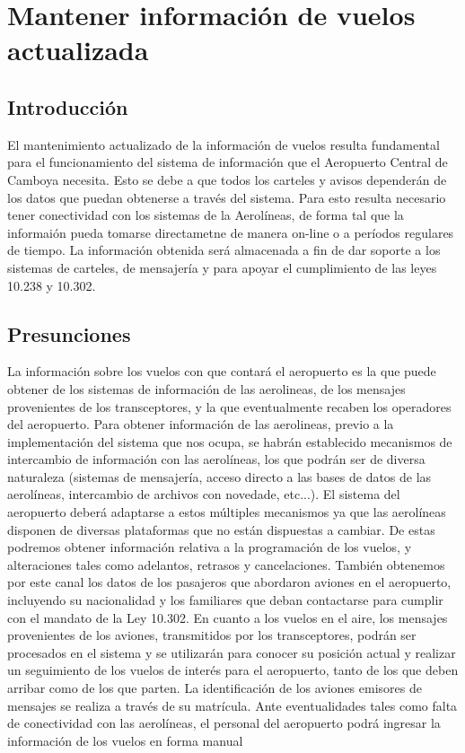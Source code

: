 \section{Mantener información de vuelos actualizada}

\subsection{Introducción}

El mantenimiento actualizado de la información de vuelos resulta fundamental para el funcionamiento del sistema de información que el Aeropuerto Central de Camboya necesita. Esto se debe a que todos los carteles y avisos dependerán de los datos que puedan obtenerse a través del sistema. Para esto resulta necesario tener conectividad con los sistemas de la Aerolíneas, de forma tal que la informaión pueda tomarse directametne de manera on-line o a períodos regulares de tiempo. La información obtenida será almacenada a fin de dar soporte a los sistemas de carteles, de mensajería y para apoyar el cumplimiento de las leyes 10.238 y 10.302.

\subsection{Presunciones}

La información sobre los vuelos con que contará el aeropuerto es la que puede  obtener de los sistemas de información de las aerolineas, de los mensajes provenientes de los transceptores, y la que eventualmente recaben los operadores del aeropuerto. Para obtener información de las aerolineas, previo a la implementación del sistema que nos ocupa, se habrán establecido mecanismos de intercambio de información con las aerolíneas, los que podrán ser de diversa naturaleza (sistemas de mensajería, acceso directo a las bases de datos de las aerolíneas, intercambio de archivos con novedade, etc...). El sistema del aeropuerto deberá adaptarse a estos múltiples mecanismos ya que las aerolíneas disponen de diversas plataformas que no están dispuestas a cambiar.
De estas podremos obtener información relativa a la programación de los vuelos, y alteraciones tales como adelantos, retrasos y cancelaciones. También obtenemos por este canal los datos de los pasajeros que abordaron aviones en el aeropuerto, incluyendo su nacionalidad y los familiares que deban contactarse para cumplir con el mandato de la Ley 10.302.
En cuanto a los vuelos en el aire, los mensajes provenientes de los aviones, transmitidos por los transceptores, podrán ser procesados en el sistema y se utilizarán para conocer su posición actual y realizar un seguimiento de los vuelos de interés para el aeropuerto, tanto de los que deben arribar como de los que parten. La identificación de los aviones emisores de mensajes se realiza a través de su matrícula. 
Ante eventualidades tales como falta de conectividad con las aerolíneas, el personal del aeropuerto podrá ingresar la información de los vuelos en forma manual


